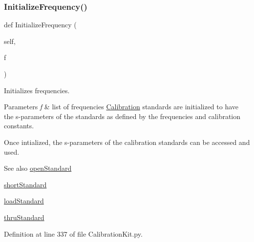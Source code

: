 \subsubsection{\texorpdfstring{Initialize\+Frequency()}{InitializeFrequency()}}
{\footnotesize\ttfamily def Initialize\+Frequency (\begin{DoxyParamCaption}\item[{}]{self,  }\item[{}]{f }\end{DoxyParamCaption})}



Initializes frequencies. 


\begin{DoxyParams}{Parameters}
{\em f} & list of frequencies \hyperlink{namespaceSignalIntegrity_1_1Measurement_1_1Calibration}{Calibration} standards are initialized to have the s-\/parameters of the standards as defined by the frequencies and calibration constants.\\
\hline
\end{DoxyParams}
Once intialized, the s-\/parameters of the calibration standards can be accessed and used. \begin{DoxySeeAlso}{See also}
\hyperlink{classSignalIntegrity_1_1Measurement_1_1CalKit_1_1CalibrationKit_1_1CalibrationKit_adfa88578140d393e4fc3d5e6976c4586}{open\+Standard} 

\hyperlink{classSignalIntegrity_1_1Measurement_1_1CalKit_1_1CalibrationKit_1_1CalibrationKit_a094c01f8f3b9b22b8759481b3d5bdb85}{short\+Standard} 

\hyperlink{classSignalIntegrity_1_1Measurement_1_1CalKit_1_1CalibrationKit_1_1CalibrationKit_af4b585ef48fed700d70b2bee7e5ffdbe}{load\+Standard} 

\hyperlink{classSignalIntegrity_1_1Measurement_1_1CalKit_1_1CalibrationKit_1_1CalibrationKit_a63691e31dc0a91dbcfe40635f9c87599}{thru\+Standard} 
\end{DoxySeeAlso}


Definition at line 337 of file Calibration\+Kit.\+py.

\mbox{\label{classSignalIntegrity_1_1Measurement_1_1CalKit_1_1CalibrationKit_1_1CalibrationKit_a3dc78f8134b7196685f6b0b5ace5e33b}} 
